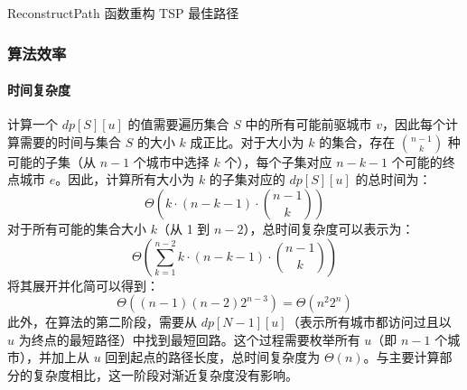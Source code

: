 \begin{algorithm}[htbp]
    \SetAlgoLined
    
    \caption{ReconstructPath 函数重构 TSP 最佳路径}
    \label{alg:reconstruct}
    
    
    \end{algorithm}

\subsubsection{算法效率}

\paragraph{时间复杂度}
计算一个 \( dp[S][u] \) 的值需要遍历集合 \( S \) 中的所有可能前驱城市 \( v \)，因此每个计算需要的时间与集合 \( S \) 的大小 \( k \) 成正比。对于大小为 \( k \) 的集合，存在 \( \binom{n-1}{k} \) 种可能的子集（从 \( n-1 \) 个城市中选择 \( k \) 个），每个子集对应 \( n-k-1 \) 个可能的终点城市 \( e \)。因此，计算所有大小为 \( k \) 的子集对应的 \( dp[S][u] \) 的总时间为：
\[
\Theta\left(k \cdot (n-k-1) \cdot \binom{n-1}{k}\right)
\]
对于所有可能的集合大小 \( k \)（从 1 到 \( n-2 \)），总时间复杂度可以表示为：
\[
    \Theta\left(\sum_{k=1}^{n-2} k \cdot (n-k-1) \cdot \binom{n-1}{k}\right)
\]
将其展开并化简可以得到：
\[
    \Theta((n-1)(n-2)2^{n-3}) = \Theta(n^2 2^n)
\]
此外，在算法的第二阶段，需要从 \( dp[N-1][u] \)（表示所有城市都访问过且以 \( u \) 为终点的最短路径）中找到最短回路。这个过程需要枚举所有 \( u \)（即 \( n-1 \) 个城市），并加上从 \( u \) 回到起点的路径长度，总时间复杂度为 \( \Theta(n) \)。与主要计算部分的复杂度相比，这一阶段对渐近复杂度没有影响。

